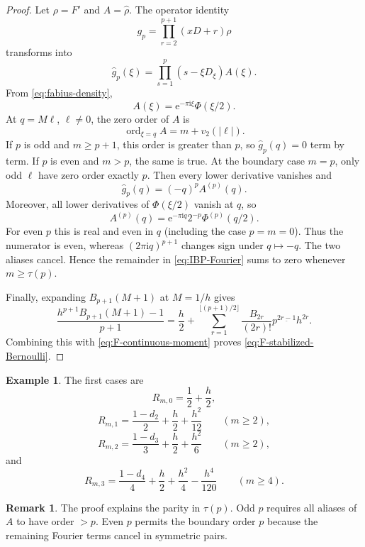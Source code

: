 \documentclass[11pt]{article}
\theoremstyle{definition}
\newtheorem{remark}[theorem]{Remark}
\newtheorem{example}[theorem]{Example}
\DeclareMathOperator{\ord}{ord}
\newcommand{\e}{\mathrm{e}}
\newcommand{\ii}{\mathrm{i}}
\newcommand{\fall}[2]{#1^{\underline{#2}}}
\begin{document}
\begin{proof}
Let $\rho=F'$ and $A=\widehat\rho$.  The operator identity
\begin{equation}
 g_p=\prod_{r=2}^{p+1}(xD+r)\rho
 \label{eq:g-operator}
\end{equation}
transforms into
\begin{equation}
 \widehat g_p(\xi)
 =\prod_{s=1}^{p}(s-\xi D_\xi)A(\xi).
 \label{eq:g-hat-operator}
\end{equation}
From \eqref{eq:fabius-density},
\begin{equation}
 A(\xi)=\e^{-\pi\ii\xi}\Phi(\xi/2).
 \label{eq:A-Phi}
\end{equation}
At $q=M\ell$, $\ell\ne0$, the zero order of $A$ is
\begin{equation}
 \ord_{\xi=q}A=m+v_2(|\ell|).
 \label{eq:A-zero-order}
\end{equation}
If $p$ is odd and $m\ge p+1$, this order is greater than $p$, so
$\widehat g_p(q)=0$ term by term.  If $p$ is even and $m>p$, the same is true.
At the boundary case $m=p$, only odd $\ell$ have zero order exactly $p$.
Then every lower derivative vanishes and
\[
 \widehat g_p(q)=(-q)^pA^{(p)}(q).
\]
Moreover, all lower derivatives of $\Phi(\xi/2)$ vanish at $q$, so
\[
 A^{(p)}(q)=\e^{-\pi\ii q}2^{-p}\Phi^{(p)}(q/2).
\]
For even $p$ this is real and even in $q$ (including the case $p=m=0$).
Thus the numerator is even, whereas $(2\pi\ii q)^{p+1}$ changes sign under
$q\mapsto-q$.  The two aliases cancel.
Hence the remainder in \eqref{eq:IBP-Fourier} sums to zero whenever
$m\ge\tau(p)$.

Finally, expanding $B_{p+1}(M+1)$ at $M=1/h$ gives
\[
 \frac{h^{p+1}B_{p+1}(M+1)-1}{p+1}
 =\frac h2+
 \sum_{r=1}^{\lfloor(p+1)/2\rfloor}
 \frac{B_{2r}}{(2r)!}\fall p{2r-1}h^{2r}.
\]
Combining this with \eqref{eq:F-continuous-moment} proves
\eqref{eq:F-stabilized-Bernoulli}.
\end{proof}

\begin{example}
The first cases are
\[
 R_{m,0}=\frac12+\frac h2,
\]
\[
 R_{m,1}=\frac{1-d_2}{2}+\frac h2+\frac{h^2}{12}
 \qquad(m\ge2),
\]
\[
 R_{m,2}=\frac{1-d_3}{3}+\frac h2+\frac{h^2}{6}
 \qquad(m\ge2),
\]
and
\[
 R_{m,3}=\frac{1-d_4}{4}+\frac h2+\frac{h^2}{4}-\frac{h^4}{120}
 \qquad(m\ge4).
\]
\end{example}

\begin{remark}
The proof explains the parity in $\tau(p)$.  Odd $p$ requires all aliases of
$A$ to have order $>p$.  Even $p$ permits the boundary order $p$ because the
remaining Fourier terms cancel in symmetric pairs.
\end{remark}
\end{document}
